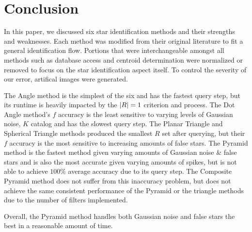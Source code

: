 \section{Conclusion}\label{sec:conclusion}
In this paper, we discussed six star identification methods and their strengths and weaknesses.
Each method was modified from their original literature to fit a general identification flow.
Portions that were interchangeable amongst all methods such as database access and centroid determination were
normalized or removed to focus on the star identification aspect itself.
To control the severity of our error, artifical images were generated.

The Angle method is the simplest of the six and has the fastest query step, but its runtime is heavily impacted by
the $\left| R \right| = 1$ criterion and  process.
The Dot Angle method's $f$ accuracy is the least sensitive to varying levels of Gaussian noise,
$K$ catalog and has the slowest query step.
The Planar Triangle and Spherical Triangle methods produced the smallest $R$ set after querying, but their $f$ accuracy
is the most sensitive to increasing amounts of false stars.
The Pyramid method is the fastest method given varying amounts of Gaussian noise \& false stars and is also the most
accurate given varying amounts of spikes, but is not able to achieve $100\%$ average accuracy due to its query step.
The Composite Pyramid method does not suffer from this inaccuracy problem, but does not achieve the same consistent
performance of the Pyramid or the triangle methods due to the number of filters implemented.

Overall, the Pyramid method handles both Gaussian noise and false stars the best in a reasonable amount of time.
